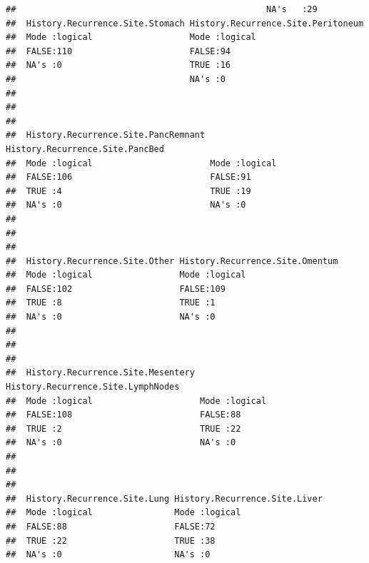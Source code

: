 \documentclass{article}\usepackage[]{graphicx}\usepackage[]{color}
\makeatletter
\newenvironment{kframe}{%
 \def\at@end@of@kframe{}%
 \ifinner\ifhmode%
  \def\at@end@of@kframe{\end{minipage}}%
  \begin{minipage}{\columnwidth}%
 \fi\fi%
 \def\FrameCommand##1{\hskip\@totalleftmargin \hskip-\fboxsep
 \colorbox{shadecolor}{##1}\hskip-\fboxsep
     \hskip-\linewidth \hskip-\@totalleftmargin \hskip\columnwidth}%
 \MakeFramed {\advance\hsize-\width
   \@totalleftmargin\z@ \linewidth\hsize
   \@setminipage}}%
 {\par\unskip\endMakeFramed%
 \at@end@of@kframe}
\newenvironment{knitrout}{}{} %
\makeatother
\begin{document}
\begin{knitrout}
\begin{kframe}
\begin{verbatim}
##                                                 NA's   :29             
##  History.Recurrence.Site.Stomach History.Recurrence.Site.Peritoneum
##  Mode :logical                   Mode :logical                     
##  FALSE:110                       FALSE:94                          
##  NA's :0                         TRUE :16                          
##                                  NA's :0                           
##                                                                    
##                                                                    
##                                                                    
##  History.Recurrence.Site.PancRemnant History.Recurrence.Site.PancBed
##  Mode :logical                       Mode :logical                  
##  FALSE:106                           FALSE:91                       
##  TRUE :4                             TRUE :19                       
##  NA's :0                             NA's :0                        
##                                                                     
##                                                                     
##                                                                     
##  History.Recurrence.Site.Other History.Recurrence.Site.Omentum
##  Mode :logical                 Mode :logical                  
##  FALSE:102                     FALSE:109                      
##  TRUE :8                       TRUE :1                        
##  NA's :0                       NA's :0                        
##                                                               
##                                                               
##                                                               
##  History.Recurrence.Site.Mesentery History.Recurrence.Site.LymphNodes
##  Mode :logical                     Mode :logical                     
##  FALSE:108                         FALSE:88                          
##  TRUE :2                           TRUE :22                          
##  NA's :0                           NA's :0                           
##                                                                      
##                                                                      
##                                                                      
##  History.Recurrence.Site.Lung History.Recurrence.Site.Liver
##  Mode :logical                Mode :logical                
##  FALSE:88                     FALSE:72                     
##  TRUE :22                     TRUE :38                     
##  NA's :0                      NA's :0                      

\end{verbatim}
\end{kframe}
\end{knitrout}
\end{document}
